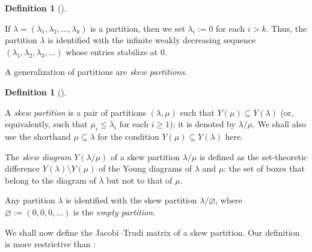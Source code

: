 \documentclass[numbers=enddot,12pt,final,onecolumn,notitlepage]{scrartcl}%
\theoremstyle{definition}
\newtheorem{defi}[theo]{Definition}
\newenvironment{definition}[1][]
{\begin{defi}[#1]\begin{leftbar}}
{\end{leftbar}\end{defi}}
\newcommand{\tup}[1]{\left( #1 \right)}
\renewcommand{\leq}{\leqslant}
\renewcommand{\geq}{\geqslant}
\theoremstyle{plainsl}
\begin{document}


\begin{definition}
If $\lambda = \tup{\lambda_1, \lambda_2, \ldots, \lambda_k}$ is
a partition, then we set $\lambda_i := 0$ for each $i > k$.
Thus, the partition $\lambda$ is identified with the infinite
weakly decreasing
sequence $\tup{\lambda_1, \lambda_2, \lambda_3, \ldots}$
whose entries stabilize at $0$.
\end{definition}

A generalization of partitions are \emph{skew partitions}.

\begin{definition}
A \emph{skew partition} is a pair of partitions $(\lambda, \mu)$ such that $Y\tup{\mu} \subseteq Y\tup{\lambda}$ (or, equivalently, such that $\mu_i \leq \lambda_i$ for each $i \geq 1$); it is denoted by $\lambda / \mu$.
We shall also use the shorthand $\mu \subseteq \lambda$ for the condition $Y\tup{\mu} \subseteq Y\tup{\lambda}$ here.

The \emph{skew diagram} $Y\tup{\lambda / \mu}$ of a skew partition $\lambda / \mu$ is defined as the set-theoretic difference $Y\tup{\lambda} \setminus Y\tup{\mu}$ of the Young diagrams of $\lambda$ and $\mu$: the set of boxes that belong to the diagram of $\lambda$ but not to that of $\mu$.

Any partition $\lambda$ is identified with the skew partition $\lambda / \varnothing$, where $\varnothing := \tup{0,0,0,\ldots}$ is the \emph{empty partition}.
\end{definition}

We shall now define the Jacobi--Trudi matrix of a skew partition. Our definition is more restrictive than \cite[Definition 2.3]{Anzis18}:
\end{document}
